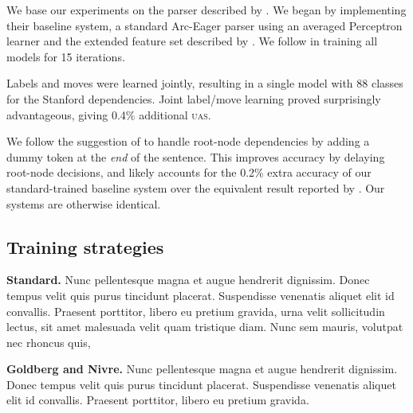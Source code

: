 \documentclass[11pt,letterpaper]{article}
\newcommand{\uas}{\textsc{uas}\xspace}
\begin{document}
We base our experiments on the parser described by \citet{goldberg:12}. We
began by implementing their baseline system, a standard Arc-Eager parser using
an averaged Perceptron learner and the extended feature set described by \citet{zhang:11}.
We follow \citeauthor{goldberg:12} in training all models for 15 iterations.

Labels and moves were learned jointly, resulting in a single model with 88 classes
for the Stanford dependencies. Joint label/move learning proved surprisingly
advantageous, giving 0.4\% additional \uas.

We follow the suggestion of \citet{nivre:squib} to handle root-node dependencies by
adding a dummy token at the \emph{end} of the sentence.
This improves accuracy by delaying root-node decisions, and likely accounts for the
0.2\% extra accuracy of our standard-trained baseline system over the equivalent result
reported by \citet{goldberg:12}. Our systems are otherwise identical.

\subsection{Training strategies}

\textbf{Standard.} Nunc pellentesque magna et augue hendrerit dignissim. Donec tempus velit quis purus tincidunt placerat. Suspendisse venenatis aliquet elit id convallis. Praesent porttitor, libero eu pretium gravida, urna velit sollicitudin lectus, sit amet malesuada velit quam tristique diam. Nunc sem mauris, volutpat nec rhoncus quis,

\textbf{Goldberg and Nivre.} Nunc pellentesque magna et augue hendrerit dignissim. Donec tempus velit quis purus tincidunt placerat. Suspendisse venenatis aliquet elit id convallis. Praesent porttitor, libero eu pretium gravida.
\end{document}
